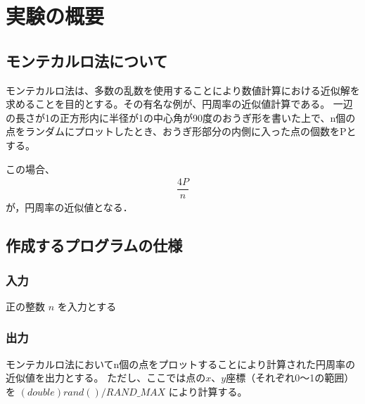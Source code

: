 

\section{実験の概要}
\subsection{モンテカルロ法について}
  モンテカルロ法は、多数の乱数を使用することにより数値計算における近似解を求めることを目的とする。その有名な例が、円周率の近似値計算である。
  一辺の長さが1の正方形内に半径が1の中心角が90度のおうぎ形を書いた上で、n個の点をランダムにプロットしたとき、おうぎ形部分の内側に入った点の個数をPとする。

  この場合、
  \begin{align*}
    \dfrac{4P}{n}
  \end{align*}
  が，円周率の近似値となる．

\subsection{作成するプログラムの仕様}
  \subsubsection{入力}
    正の整数 $n$ を入力とする
  
  \subsubsection{出力}
    モンテカルロ法においてn個の点をプロットすることにより計算された円周率の近似値を出力とする。
    ただし、ここでは点の$x$、$y$座標（それぞれ0～1の範囲）を $(double)rand() / RAND\_MAX$ により計算する。


